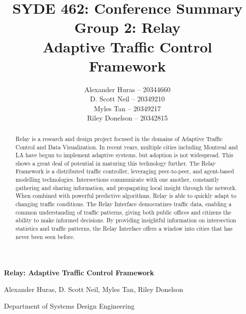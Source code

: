 \documentclass[a4paper,10pt]{article}
\author{  Alexander Huras -- 20344660\\
  D. Scott Neil -- 20349210\\
  Myles Tan -- 20349217\\
  Riley Donelson -- 20342815\\}
\title{SYDE 462: Conference Summary
\\Group 2: Relay \\
  Adaptive Traffic Control Framework}
\begin{document}
%

\centerline{  \bf \Large Relay: Adaptive Traffic Control Framework}
\centerline{Alexander Huras, D. Scott Neil, Myles Tan, Riley Donelson}
\centerline{Department of Systems Design Engineering}

\begin{abstract}
Relay is a research and design project focused in the domains of Adaptive Traffic Control and Data Visualization.
In recent years, multiple cities including Montreal and LA have begun to implement adaptive systems, but adoption is not widespread.
This shows a great deal of potential in maturing this technology further.
The Relay Framework is a distributed traffic controller, leveraging peer-to-peer, and agent-based modelling technologies.
Intersections communicate with one another, constantly gathering and sharing information, and propagating local insight through the network.
When combined with powerful predictive algorithms, Relay is able to quickly adapt to changing traffic conditions.
The Relay Interface democratizes traffic data, enabling a common understanding of traffic patterns, giving both public offices and citizens the ability to make informed decisions.
By providing insightful information on intersection statistics and traffic patterns, the Relay Interface offers a window into cities that has never been seen before.
\end{abstract}
\end{document}
